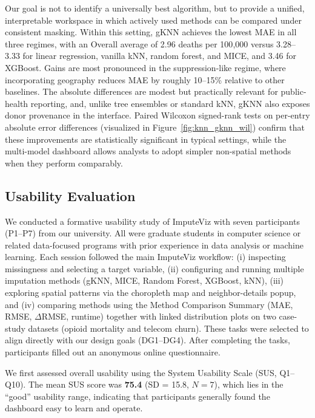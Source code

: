 \documentclass{egpubl}
\newcommand{\gknn}{gKNN\xspace}
\newcommand{\tool}{ImputeViz\xspace}
\begin{document}
Our goal is not to identify a universally best algorithm, but to provide a unified, interpretable workspace in which actively used methods can be compared under consistent masking. Within this setting, \gknn{} achieves the lowest MAE in all three regimes, with an Overall average of 2.96 deaths per 100{,}000 versus 3.28--3.33 for linear regression, vanilla kNN, random forest, and MICE, and 3.46 for XGBoost. Gains are most pronounced in the suppression-like regime, where incorporating geography reduces MAE by roughly 10--15\% relative to other baselines. The absolute differences are modest but practically relevant for public-health reporting, and, unlike tree ensembles or standard kNN, \gknn{} also exposes donor provenance in the interface. Paired Wilcoxon signed-rank tests on per-entry absolute error differences (visualized in Figure~\ref{fig:knn_gknn_wil}) confirm that these improvements are statistically significant in typical settings, while the multi-model dashboard allows analysts to adopt simpler non-spatial methods when they perform comparably.
\vspace{-8pt}

\subsection{Usability Evaluation}
\label{sec:user-study}

We conducted a formative usability study of \tool with seven participants (P1--P7) from our university. All were graduate students in computer science or related data-focused programs with prior experience in data analysis or machine learning. Each session followed the main \tool workflow: (i) inspecting missingness and selecting a target variable, (ii) configuring and running multiple imputation methods (gKNN, MICE, Random Forest, XGBoost, kNN), (iii) exploring spatial patterns via the choropleth map and neighbor-details popup, and (iv) comparing methods using the Method Comparison Summary (MAE, RMSE, $\Delta$RMSE, runtime) together with linked distribution plots on two case-study datasets (opioid mortality and telecom churn). These tasks were selected to align directly with our design goals (DG1–DG4). After completing the tasks, participants filled out an anonymous online questionnaire.

We first assessed overall usability using the System Usability Scale (SUS, Q1--Q10). The mean SUS score was \textbf{75.4} (SD = 15.8, $N = 7$), which lies in the ``good'' usability range, indicating that participants generally found the dashboard easy to learn and operate.
\end{document}
